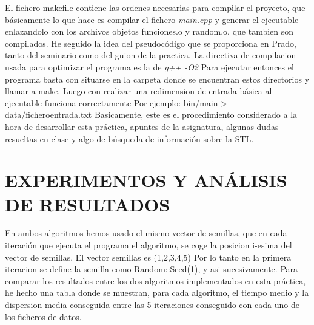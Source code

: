 \documentclass{article}
\begin{document}
\vspace{10mm}
El fichero makefile contiene las ordenes necesarias para compilar el proyecto, 
que básicamente lo que hace es compilar el fichero \emph{main.cpp} y generar el ejecutable 
enlazandolo con los archivos objetos funciones.o y random.o, que tambien son compilados.
He seguido la idea del pseudocódigo que se proporciona en Prado, tanto del seminario como 
del guion de la practica.
La directiva de compilacion usada para optimizar el programa es la de \emph{g++ -O2}
\newline Para ejecutar entonces el programa basta con situarse en la carpeta donde se 
encuentran estos directorios y llamar a make.
Luego con realizar una redimension de entrada básica al ejecutable funciona correctamente
\newline Por ejemplo: bin/main > data/ficheroentrada.txt
\newline Basicamente, este es el procedimiento considerado a la hora de desarrollar esta 
práctica, apuntes de la asignatura, algunas dudas resueltas en clase y algo de búsqueda 
de información sobre la STL.

\newpage
\section {\large EXPERIMENTOS Y ANÁLISIS DE RESULTADOS}
En ambos algoritmos hemos usado el mismo vector de semillas, que en cada iteración 
que ejecuta el programa el algoritmo, se coge la posicion i-esima del vector de semillas.
\newline El vector semillas es (1,2,3,4,5)
Por lo tanto en la primera iteracion se define la semilla como Random::Seed(1), y asi 
sucesivamente.
\newline Para comparar los resultados entre los dos algoritmos implementados en esta práctica, he hecho 
una tabla donde se muestran, para cada algoritmo, el tiempo medio y la dispersion media conseguida entre 
las 5 iteraciones conseguido con cada uno de los ficheros de datos.
\end{document}
